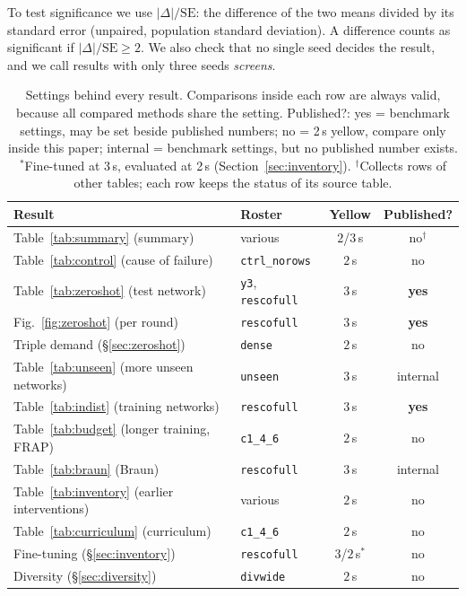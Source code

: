 \documentclass[conference]{IEEEtran}
\begin{document}
To test significance we use $|\Delta|/\mathrm{SE}$: the difference of the two means divided
by its standard error (unpaired, population standard deviation). A difference counts as
significant if $|\Delta|/\mathrm{SE}\ge 2$. We also check that no single seed decides the
result, and we call results with only three seeds \emph{screens}.

\begin{table}[ht]
\caption{Settings behind every result. Comparisons inside each row are always valid,
because all compared methods share the setting. \textnormal{Published?}: \textnormal{yes}
= benchmark settings, may be set beside published numbers; \textnormal{no} = 2\,s yellow,
compare only inside this paper; \textnormal{internal} = benchmark settings, but no
published number exists. $^{*}$Fine-tuned at 3\,s, evaluated at 2\,s
(Section~\ref{sec:inventory}). $^{\dagger}$Collects rows of other tables; each row keeps
the status of its source table.}
\label{tab:config}
\centering\scriptsize\setlength{\tabcolsep}{4pt}
\begin{tabular}{@{}llcc@{}}
\toprule
Result & Roster & Yellow & Published? \\
\midrule
Table~\ref{tab:summary} (summary) & various & $2$/$3$\,s & no$^{\dagger}$ \\
Table~\ref{tab:control} (cause of failure) & \texttt{ctrl\_norows} & $2$\,s & no \\
Table~\ref{tab:zeroshot} (test network) & \texttt{y3}, \texttt{rescofull} & $3$\,s & \textbf{yes} \\
Fig.~\ref{fig:zeroshot} (per round) & \texttt{rescofull} & $3$\,s & \textbf{yes} \\
Triple demand (\S\ref{sec:zeroshot}) & \texttt{dense} & $2$\,s & no \\
Table~\ref{tab:unseen} (more unseen networks) & \texttt{unseen} & $3$\,s & internal \\
Table~\ref{tab:indist} (training networks) & \texttt{rescofull} & $3$\,s & \textbf{yes} \\
Table~\ref{tab:budget} (longer training, FRAP) & \texttt{c1\_4\_6} & $2$\,s & no \\
Table~\ref{tab:braun} (Braun) & \texttt{rescofull} & $3$\,s & internal \\
Table~\ref{tab:inventory} (earlier interventions) & various & $2$\,s & no \\
Table~\ref{tab:curriculum} (curriculum) & \texttt{c1\_4\_6} & $2$\,s & no \\
Fine-tuning (\S\ref{sec:inventory}) & \texttt{rescofull} & $3$/$2$\,s$^{*}$ & no \\
Diversity (\S\ref{sec:diversity}) & \texttt{divwide} & $2$\,s & no \\
\bottomrule
\end{tabular}
\end{table}
\end{document}
